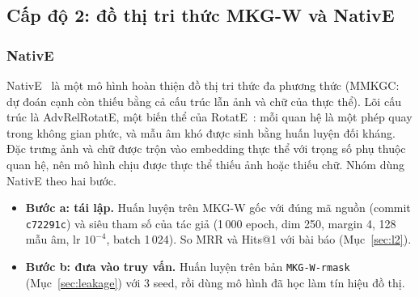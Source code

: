 \subsection{Cấp độ 2: đồ thị tri thức MKG-W và NativE}
\label{sec:method-l2}

\subsubsection{NativE}
NativE~\cite{zhang2024native} là một mô hình hoàn thiện đồ thị tri thức đa phương thức (MMKGC: dự đoán cạnh còn thiếu bằng
cả cấu trúc lẫn ảnh và chữ của thực thể). Lõi cấu trúc là AdvRelRotatE, một biến thể của RotatE~\cite{sun2019rotate}: mỗi
quan hệ là một phép quay trong không gian phức, và mẫu âm khó được sinh bằng huấn luyện đối kháng. Đặc trưng ảnh và chữ được
trộn vào embedding thực thể với trọng số phụ thuộc quan hệ, nên mô hình chịu được thực thể thiếu ảnh hoặc thiếu chữ. Nhóm
dùng NativE theo hai bước.
\begin{itemize}
\item \textbf{Bước a: tái lập.} Huấn luyện trên MKG-W gốc với đúng mã nguồn (commit \texttt{c72291c}) và siêu tham số của
tác giả (1\,000 epoch, dim 250, margin 4, 128 mẫu âm, lr $10^{-4}$, batch 1\,024). So MRR và Hits@1 với bài báo
(Mục~\ref{sec:l2}).
\item \textbf{Bước b: đưa vào truy vấn.} Huấn luyện trên bản \texttt{MKG-W-rmask} (Mục~\ref{sec:leakage}) với 3 seed, rồi dùng
mô hình đã học làm tín hiệu đồ thị.
\end{itemize}

